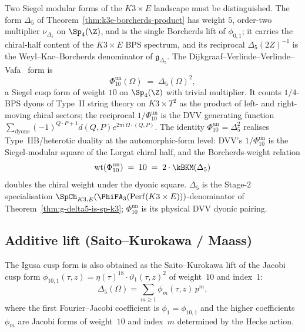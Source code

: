 \begin{remark}[The chiral-half \texorpdfstring{$\Delta_5$}{Delta-5} and its unnormalised dyonic square \texorpdfstring{$\Delta_{10} = \Phi_{10}^{\mathrm{un}}$}{Delta-10 = Phi-10-un}]
\label{rem:delta5-vs-delta10-half-bps-square}
Two Siegel modular forms of the $K3 \times E$ landscape must be distinguished. The form $\Delta_5$ of Theorem~\ref{thm:k3e-borcherds-product} has weight $5$, order-two multiplier $\nu_{\Delta_5}$ on $\Sp_4(\Z)$, and is the single Borcherds lift of $\phi_{0,1}$; it carries the chiral-half content of the $K3 \times E$ BPS spectrum, and its reciprocal $\Delta_5(2Z)^{-1}$ is the Weyl--Kac--Borcherds denominator of $\mathfrak{g}_{\Delta_5}$. The Dijkgraaf--Verlinde--Verlinde--Vafa~\cite{DVV1997} form is
\[
 \Phi_{10}^{\mathrm{un}}(\Omega) \;=\; \Delta_5(\Omega)^2,
\]
a Siegel cusp form of weight $10$ on $\Sp_4(\Z)$ with trivial multiplier. It counts $1/4$-BPS dyons of Type~II string theory on $K3 \times T^2$ as the product of left- and right-moving chiral sectors; the reciprocal $1/\Phi_{10}^{\mathrm{un}}$ is the DVV generating function $\sum_{\mathrm{dyons}} (-1)^{Q \cdot P + 1} d(Q, P) e^{2\pi i\, \Omega \cdot (Q, P)}$. The identity \(\Phi_{10}^{\mathrm{un}}=\Delta_5^2\) realises Type~IIB/heterotic duality at the automorphic-form level: DVV's \(1/\Phi_{10}^{\mathrm{un}}\) is the Siegel-modular square of the Lorgat chiral half, and the Borcherds-weight relation
\[
 \mathrm{wt}(\Phi_{10}^{\mathrm{un}}) \;=\; 10 \;=\; 2 \cdot \kBKM(\Delta_5)
\]
doubles the chiral weight under the dyonic square. $\Delta_5$ is the Stage-$2$ specialisation $\SpCh_{K3, E}(\PhiFA_3(\mathrm{Perf}(K3 \times E)))$-denominator of Theorem~\ref{thm:g-delta5-is-sp-k3}; \(\Phi_{10}^{\mathrm{un}}\) is its physical DVV dyonic pairing.
\end{remark}

\subsection{Additive lift (Saito--Kurokawa / Maass)}
\label{subsec:k3e-additive-lift}

\begin{theorem}
\label{thm:k3e-additive-lift}
The Igusa cusp form is also obtained as the Saito--Kurokawa lift of the Jacobi cusp form $\phi_{10,1}(\tau, z) = \eta(\tau)^{18} \cdot \vartheta_1(\tau, z)^2$ of weight~$10$ and index~$1$:
\[
 \Delta_5(\Omega) = \sum_{m \geq 1} \phi_m(\tau, z) \, p^m,
\]
where the first Fourier--Jacobi coefficient is $\phi_1 = \phi_{10,1}$ and the higher coefficients $\phi_m$ are Jacobi forms of weight~$10$ and index~$m$ determined by the Hecke action.
\end{theorem}

